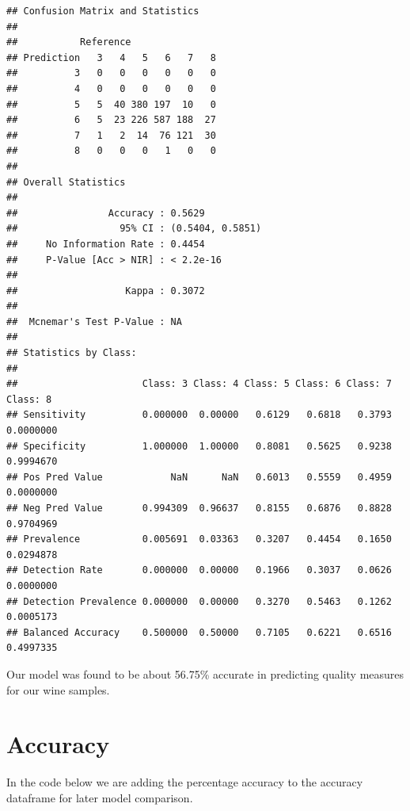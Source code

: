 \documentclass[
]{book}
\newenvironment{Shaded}{\begin{snugshade}}{\end{snugshade}}
\newcommand{\DecValTok}[1]{\textcolor[rgb]{0.00,0.00,0.81}{#1}}
\newcommand{\FloatTok}[1]{\textcolor[rgb]{0.00,0.00,0.81}{#1}}
\newcommand{\FunctionTok}[1]{\textcolor[rgb]{0.00,0.00,0.00}{#1}}
\newcommand{\NormalTok}[1]{#1}
\newcommand{\OtherTok}[1]{\textcolor[rgb]{0.56,0.35,0.01}{#1}}
\newcommand{\SpecialCharTok}[1]{\textcolor[rgb]{0.00,0.00,0.00}{#1}}
\newcommand{\StringTok}[1]{\textcolor[rgb]{0.31,0.60,0.02}{#1}}
\begin{document}
\begin{verbatim}
## Confusion Matrix and Statistics
## 
##           Reference
## Prediction   3   4   5   6   7   8
##          3   0   0   0   0   0   0
##          4   0   0   0   0   0   0
##          5   5  40 380 197  10   0
##          6   5  23 226 587 188  27
##          7   1   2  14  76 121  30
##          8   0   0   0   1   0   0
## 
## Overall Statistics
##                                           
##                Accuracy : 0.5629          
##                  95% CI : (0.5404, 0.5851)
##     No Information Rate : 0.4454          
##     P-Value [Acc > NIR] : < 2.2e-16       
##                                           
##                   Kappa : 0.3072          
##                                           
##  Mcnemar's Test P-Value : NA              
## 
## Statistics by Class:
## 
##                      Class: 3 Class: 4 Class: 5 Class: 6 Class: 7  Class: 8
## Sensitivity          0.000000  0.00000   0.6129   0.6818   0.3793 0.0000000
## Specificity          1.000000  1.00000   0.8081   0.5625   0.9238 0.9994670
## Pos Pred Value            NaN      NaN   0.6013   0.5559   0.4959 0.0000000
## Neg Pred Value       0.994309  0.96637   0.8155   0.6876   0.8828 0.9704969
## Prevalence           0.005691  0.03363   0.3207   0.4454   0.1650 0.0294878
## Detection Rate       0.000000  0.00000   0.1966   0.3037   0.0626 0.0000000
## Detection Prevalence 0.000000  0.00000   0.3270   0.5463   0.1262 0.0005173
## Balanced Accuracy    0.500000  0.50000   0.7105   0.6221   0.6516 0.4997335
\end{verbatim}

Our model was found to be about 56.75\% accurate in predicting quality measures for our wine samples.

\hypertarget{accuracy-1}{%
\section{Accuracy}\label{accuracy-1}}

In the code below we are adding the percentage accuracy to the accuracy dataframe for later model comparison.

\begin{Shaded}
\end{Shaded}
\end{document}
